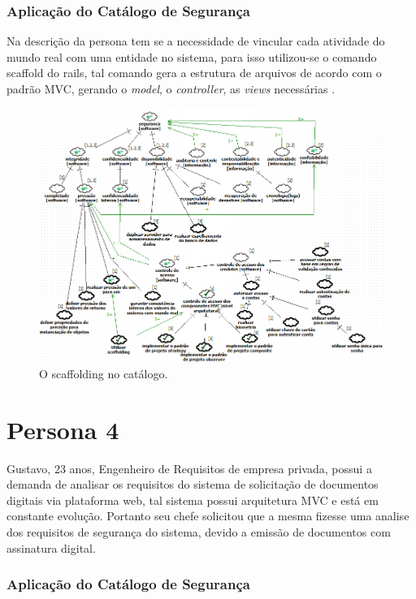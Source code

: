 \subsubsection{Aplicação do Catálogo de Segurança}

Na descrição da persona tem se a necessidade de vincular cada atividade do mundo real com uma entidade no sistema, para isso utilizou-se o comando scaffold do rails, tal comando gera a estrutura de arquivos de acordo com o padrão MVC, gerando o \textit{model}, o \textit{controller}, as \textit{views} necessárias \cite{railscommunity}. 

\begin{figure}[h!]
	\centering
	\includegraphics[keepaspectratio=true,scale=0.7]{figuras/catalogoPersona3.PNG}
	\caption{O scaffolding no catálogo.}
	\label{catalogoPersona3}
\end{figure}


\section{Persona 4}
\label{subsec:persona4}


Gustavo, 23 anos, Engenheiro de Requisitos de empresa privada, possui a demanda de analisar os requisitos do sistema de solicitação de documentos digitais via plataforma web, tal sistema possui arquitetura MVC e está em constante evolução. Portanto seu chefe solicitou que a mesma fizesse uma analise dos requisitos de segurança do sistema, devido a emissão de documentos com assinatura digital.

\subsubsection{Aplicação do Catálogo de Segurança}

